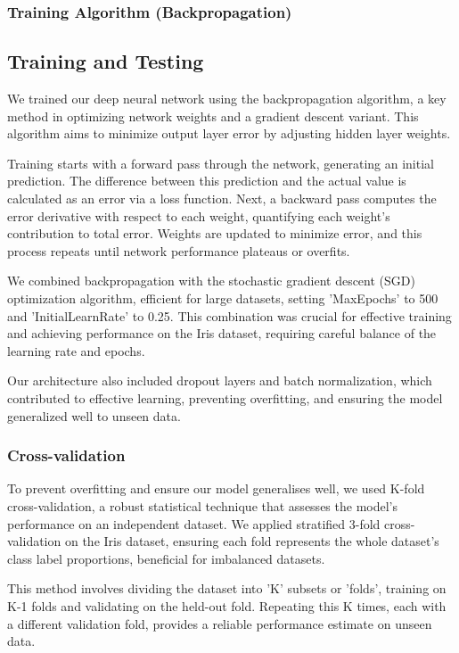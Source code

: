 \documentclass[conference]{inc/IEEEtran}
\begin{document}
\subsubsection{Training Algorithm (Backpropagation)}

\subsection{Training and Testing}

We trained our deep neural network using the backpropagation algorithm, a key method in optimizing network weights and a gradient descent variant. This algorithm aims to minimize output layer error by adjusting hidden layer weights.

Training starts with a forward pass through the network, generating an initial prediction. The difference between this prediction and the actual value is calculated as an error via a loss function. Next, a backward pass computes the error derivative with respect to each weight, quantifying each weight's contribution to total error. Weights are updated to minimize error, and this process repeats until network performance plateaus or overfits.

We combined backpropagation with the stochastic gradient descent (SGD) optimization algorithm, efficient for large datasets, setting 'MaxEpochs' to 500 and 'InitialLearnRate' to 0.25. This combination was crucial for effective training and achieving performance on the Iris dataset, requiring careful balance of the learning rate and epochs.

Our architecture also included dropout layers and batch normalization, which contributed to effective learning, preventing overfitting, and ensuring the model generalized well to unseen data.

\subsubsection{Cross-validation}

To prevent overfitting and ensure our model generalises well, we used K-fold cross-validation, a robust statistical technique that assesses the model's performance on an independent dataset. We applied stratified 3-fold cross-validation on the Iris dataset, ensuring each fold represents the whole dataset's class label proportions, beneficial for imbalanced datasets.

This method involves dividing the dataset into 'K' subsets or 'folds', training on K-1 folds and validating on the held-out fold. Repeating this K times, each with a different validation fold, provides a reliable performance estimate on unseen data.
\end{document}
